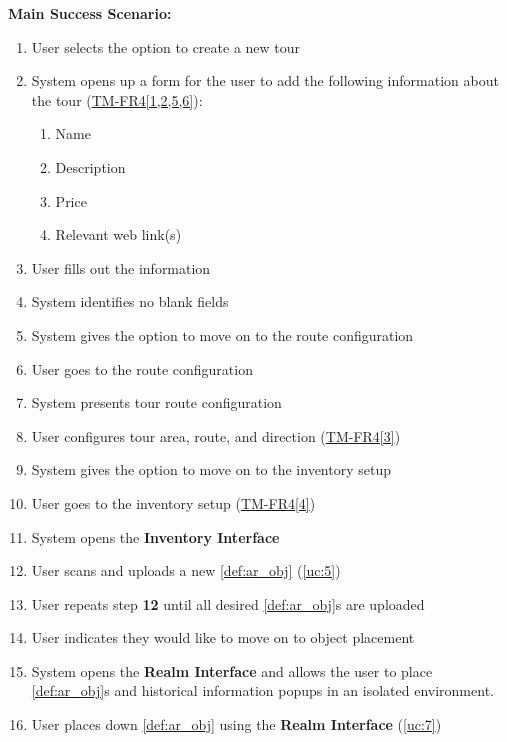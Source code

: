\documentclass{article}
\begin{document}
\begin{enumerate}[label=\textbf{UC\arabic*}]
          \textbf{Main Success Scenario:}
          \begin{enumerate}[label=\textbf{\arabic*.}]
              \item User selects the option to create a new tour
              \item System opens up a form for the user to add the following information about the tour (\hyperref[ssub:tour_management]{TM-FR4[1,2,5,6]}):
                    \begin{enumerate}
                        \item Name
                        \item Description
                        \item Price
                        \item Relevant web link(s)
                    \end{enumerate}
              \item User fills out the information
              \item System identifies no blank fields
              \item System gives the option to move on to the route configuration
              \item User goes to the route configuration
              \item System presents tour route configuration
              \item User configures tour area, route, and direction (\hyperref[ssub:tour_management]{TM-FR4[3]})
              \item System gives the option to move on to the inventory setup
              \item User goes to the inventory setup (\hyperref[ssub:tour_management]{TM-FR4[4]})
              \item System opens the \textbf{Inventory Interface}
              \item User scans and uploads a new \ref{def:ar_obj} (\ref{uc:5})
              \item User repeats step \textbf{12} until all desired \ref{def:ar_obj}s are uploaded
              \item User indicates they would like to move on to object placement
              \item System opens the \textbf{Realm Interface} and allows the user to place \ref{def:ar_obj}s and historical information popups in an isolated environment.
              \item User places down \ref{def:ar_obj} using the \textbf{Realm Interface} (\ref{uc:7})

\end{enumerate}
\end{enumerate}
\end{document}
